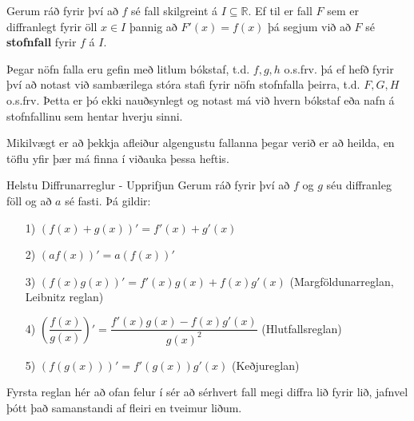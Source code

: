 \if {}

\begin{skilgr}{}
Gerum ráð fyrir því að $f$ sé fall skilgreint á $I \subseteq \mathbb{R}$. Ef til er fall $F$ sem er diffranlegt fyrir öll $x \in I$ þannig að $F'(x) = f(x)$ þá segjum við að $F$ sé \textbf{stofnfall} fyrir $f$ á $I$.
\end{skilgr}

\begin{ath}
Þegar nöfn falla eru gefin með litlum bókstaf, t.d. $f, g, h$ o.s.frv. þá ef hefð fyrir því að notast við sambærilega stóra stafi fyrir nöfn stofnfalla þeirra, t.d. $F, G, H$ o.s.frv. Þetta er þó ekki nauðsynlegt og notast má við hvern bókstaf eða nafn á stofnfallinu sem hentar hverju sinni.
\end{ath}

\begin{ath}
Mikilvægt er að þekkja afleiður algengustu fallanna þegar verið er að heilda, en töflu yfir þær má finna í viðauka þessa heftis.
\end{ath}

\begin{regla}{Helstu Diffrunarreglur - Upprifjun}
Gerum ráð fyrir því að $f$ og $g$ séu diffranleg föll og að $a$ sé fasti. Þá gildir:
\begin{itemize}
\setlength\itemsep{5mm}
\item[1)] $\left(f(x)+g(x)\right)' = f'(x)+g'(x)$

\item[2)] $\left(af(x)\right)' = a\left(f(x)\right)'$

\item[3)] $\left(f(x)g(x)\right)' = f'(x)g(x)+f(x)g'(x)$ \; (Margföldunarreglan, Leibnitz reglan)

\item[4)] $\left(\dfrac{f(x)}{g(x)}\right)' = \dfrac{f'(x)g(x)-f(x)g'(x)}{g(x)^{2}}$ \hspace{3mm} (Hlutfallsreglan)

\item[5)] $\left(f(g(x))\right)' = f'(g(x))g'(x)$ \hspace{18mm} (Keðjureglan)
\end{itemize}
\end{regla}

\begin{ath}
Fyrsta reglan hér að ofan felur í sér að sérhvert fall megi diffra lið fyrir lið, jafnvel þótt það samanstandi af fleiri en tveimur liðum.
\end{ath}

